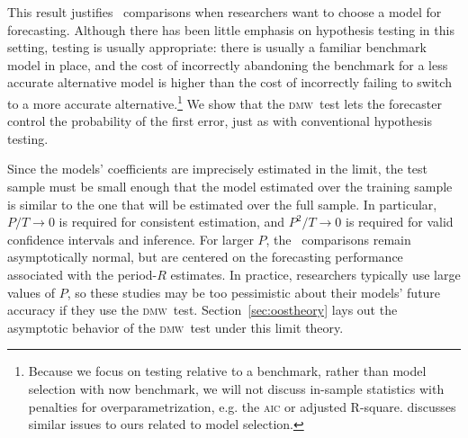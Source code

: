 \documentclass[11pt]{article}
\newcommand{\dmw}{\textsc{dmw}}
\begin{document}
This result justifies \oos\ comparisons when researchers want to
choose a model for forecasting.  Although there has been little
emphasis on hypothesis testing in this setting, testing is usually
appropriate: there is usually a familiar benchmark model in place, and
the cost of incorrectly abandoning the benchmark for a less accurate
alternative model is higher than the cost of incorrectly failing to
switch to a more accurate alternative.\footnote{Because we focus on
  testing relative to a benchmark, rather than model selection with
  now benchmark, we will not discuss in-sample statistics with
  penalties for overparametrization, e.g. the \textsc{aic} or adjusted
  R-square.  \citet{Lee:08} discusses similar issues to ours related
  to model selection.}
We show that the \dmw\ test lets the forecaster control the
probability of the first error, just as with conventional hypothesis
testing.  

Since the models' coefficients are imprecisely estimated in the limit,
the test sample must be small enough that the model estimated over
the training sample is similar to the one that will be estimated over
the full sample.  In particular, $P/T \to 0$ is required for
consistent estimation, and $P^2/T \to 0$ is required for valid
confidence intervals and inference.  For larger $P$, the \oos\
comparisons remain asymptotically normal, but are centered on the
forecasting performance associated with the period-$R$ estimates.  In
practice, researchers typically use large values of $P$, so these
studies may be too pessimistic about their models' future accuracy if
they use the \dmw\ test.  Section~\ref{sec:oostheory} lays out the
asymptotic behavior of the \dmw\ test under this limit theory.
\end{document}
